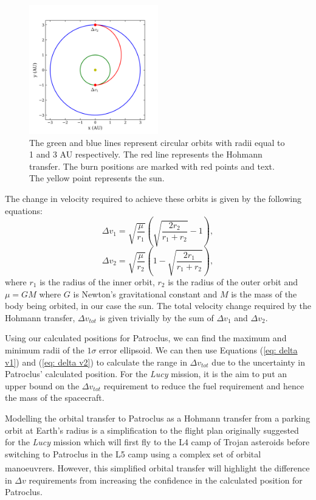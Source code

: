 \documentclass[10pt, twocolumn]{revtex4}    %
\newcommand{\scite}[1]{\textsuperscript{\cite{#1}}}
\begin{document}
\begin{figure}[h!]
\centering
\includegraphics[width=0.5\textwidth]{20180410_200052_HOHMANN_TRANSFER_EXAMPLE}
\caption{The green and blue lines represent circular orbits with radii equal to 1 and 3 AU respectively. The red line represents the Hohmann transfer. The burn positions are marked with red points and text. The yellow point represents the sun.}
\label{fig: hohmann trasnfer}
\end{figure}

The change in velocity required to achieve these orbits is given by the following equations:
\begin{equation} \label{eq: delta v1}
\Delta v_1 = \sqrt{\frac{\mu}{r_1}}\left( \sqrt{\frac{2r_2}{r_1+r_2}}-1 \right),
\end{equation} 
\begin{equation} \label{eq: delta v2}
\Delta v_2 = \sqrt{\frac{\mu}{r_2}}\left( 1- \sqrt{\frac{2r_1}{r_1+r_2}} \right),
\end{equation} 
where $r_1$ is the radius of the inner orbit, $r_2$ is the radius of the outer orbit and $\mu = GM$ where $G$ is Newton's gravitational constant and $M$ is the mass of the body being orbited, in our case the sun. The total velocity change required by the Hohmann transfer, $\Delta v_{tot}$ is given trivially by the sum of $\Delta v_1$ and $\Delta v_2$.

Using our calculated positions for Patroclus, we can find the maximum and minimum radii of the $1\sigma$ error ellipsoid. We can then use Equations (\ref{eq: delta v1}) and (\ref{eq: delta v2}) to calculate the range in $\Delta v_{tot}$ due to the uncertainty in Patroclus' calculated position. For the \textit{Lucy} mission, it is the aim to put an upper bound on the $\Delta v_{tot}$ requirement to reduce the fuel requirement and hence the mass of the spacecraft.

Modelling the orbital transfer to Patroclus as a Hohmann transfer from a parking orbit at Earth's radius is a simplification to the flight plan originally suggested for the \textit{Lucy} mission which will first fly to the L4 camp of Trojan asteroids before switching to Patroclus in the L5 camp using a complex set of orbital manoeuvrers.\scite{47thLunarPlanetary} However, this simplified orbital transfer will highlight the difference in $\Delta v$ requirements from increasing the confidence in the calculated position for Patroclus.
\end{document}
